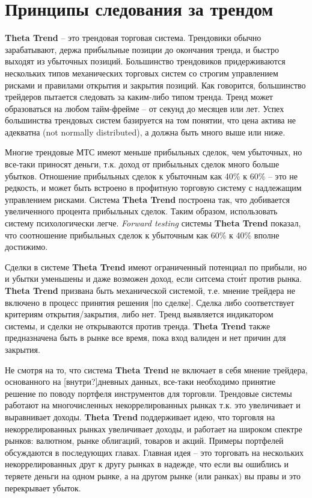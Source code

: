 \documentclass[12pt,DIV=18]{scrartcl}
\begin{document}
\section{Принципы следования за трендом}
\label{chapter2}

\bigskip

\textbf{Theta Trend} -- это трендовая торговая система. Трендовики обычно зарабатывают, держа прибыльные позиции до окончания тренда, и быстро выходят из убыточных позиций. Большинство трендовиков придерживаются нескольких типов механических торговых систем со строгим управлением рисками и правилами открытия и закрытия позиций. Как говорится, большинство трейдеров пытается следовать за каким-либо типом  тренда. Тренд может образоваться на любом тайм-фрейме -- от секунд до месяцев или лет. Успех большинства трендовых систем базируется на том понятии, что цена актива не адекватна (not normally 
distributed), а должна быть много выше или ниже.

\bigskip

Многие трендовые МТС имеют меньше прибыльных сделок, чем убыточных, но все-таки приносят деньги, т.к. доход от прибыльных сделок много больше убытков. Отношение прибыльных сделок к убыточным как 40\% к 60\% -- это не редкость, и может быть встроено в профитную торговую систему с надлежащим управлением рисками. Система \textbf{Theta Trend} построена так, что добивается увеличенного процента прибыльных сделок. Таким образом, использовать систему психологически легче. \textit{Forward testing} системы \textbf{Theta Trend} показал, что соотношение прибыльных сделок к убыточным как 60\% к 40\% вполне достижимо.

\bigskip

Сделки в системе \textbf{Theta Trend} имеют ограниченный потенциал по прибыли, но и убытки уменьшены и даже возможен доход, если ситсема сто\'{и}т против рынка. \textbf{Theta Trend} призвана быть механической системой, т.е. мнение трейдера не включено в процесс принятия решения [по сделке]. Сделка либо соответствует критериям открытия/закрытия, либо нет. Тренд выявляется индикатором системы, и сделки не открываются против тренда. \textbf{Theta Trend} также предназначена быть в рынке все время, пока вход валиден и нет причин для закрытия.

\bigskip

Не смотря на то, что система \textbf{Theta Trend} не включает в себя мнение трейдера, основанного на [внутри?]дневных данных, все-таки необходимо принятие решение по поводу портфеля инструментов для торговли. Трендовые системы работают на многочисленных некоррелированных рынках т.к. это увеличивает и выравнивает доходы. \textbf{Theta Trend} поддерживает идею, что торговля на некоррелированных рынках увеличивает доходы, и работает на широком спектре рынков: валютном, рынке облигаций, товаров и акций. Примеры портфелей обсуждаются в последующих главах. Главная идея -- это торговать на нескольких некоррелированных друг к другу рынках в надежде, что если вы ошиблись и теряете деньги на одном рынке, а на другом рынке (или ранках) вы правы и это перекрывает убыток.
\end{document}
